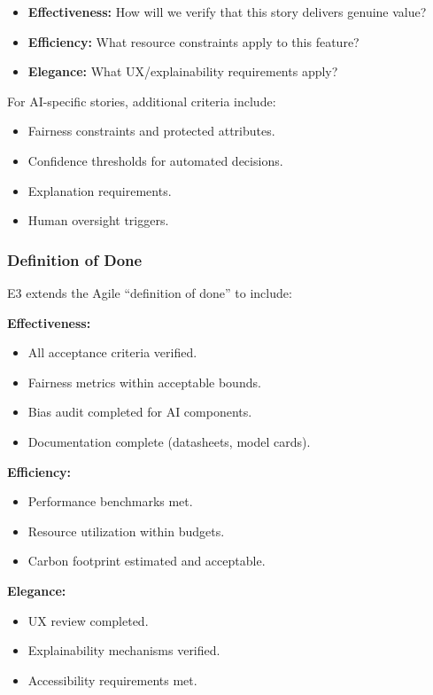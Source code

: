 \documentclass[11pt,a4paper]{article}
\begin{document}
\begin{itemize}[leftmargin=2em]
    \item \textbf{Effectiveness:} How will we verify that this story delivers genuine value?
    \item \textbf{Efficiency:} What resource constraints apply to this feature?
    \item \textbf{Elegance:} What UX/explainability requirements apply?
\end{itemize}

For AI-specific stories, additional criteria include:

\begin{itemize}[leftmargin=2em]
    \item Fairness constraints and protected attributes.
    \item Confidence thresholds for automated decisions.
    \item Explanation requirements.
    \item Human oversight triggers.
\end{itemize}

\subsubsection{Definition of Done}

E3 extends the Agile ``definition of done'' to include:

\textbf{Effectiveness:}
\begin{itemize}[leftmargin=2em]
    \item All acceptance criteria verified.
    \item Fairness metrics within acceptable bounds.
    \item Bias audit completed for AI components.
    \item Documentation complete (datasheets, model cards).
\end{itemize}

\textbf{Efficiency:}
\begin{itemize}[leftmargin=2em]
    \item Performance benchmarks met.
    \item Resource utilization within budgets.
    \item Carbon footprint estimated and acceptable.
\end{itemize}

\textbf{Elegance:}
\begin{itemize}[leftmargin=2em]
    \item UX review completed.
    \item Explainability mechanisms verified.
    \item Accessibility requirements met.
\end{itemize}
\end{document}
